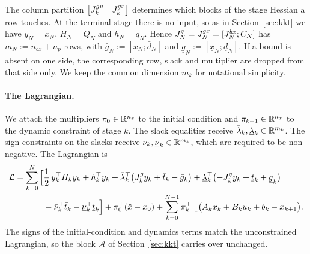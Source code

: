 The column partition $\begin{bmatrix} {J^{gu}_{k}} & {J^{gx}_{k}} \end{bmatrix}$ determines which blocks of the stage Hessian a row touches.
At the terminal stage there is no input, so as in Section~\ref{sec:kkt} we have $y_N = x_N$, $H_N = Q_N$ and $h_N = q_N$.
Hence ${J^{g}_{N}} = {J^{gx}_{N}} = [J_N^{bx}; C_N]$ has $m_N := n_{bx} + n_p$ rows, with $\bar{g}_N := [\bar{x}_N; \bar{d}_N]$ and $\underline{g}_N := [\underline{x}_N; \underline{d}_N]$.
If a bound is absent on one side, the corresponding row, slack and multiplier are dropped from that side only.
We keep the common dimension $m_k$ for notational simplicity.

\paragraph{The Lagrangian.}
We attach the multipliers $\pi_0 \in \mathbb{R}^{n_x}$ to the initial condition and $\pi_{k+1} \in \mathbb{R}^{n_x}$ to the dynamic constraint of stage $k$.
The slack equalities receive $\bar{\lambda}_k, \underline{\lambda}_k \in \mathbb{R}^{m_k}$.
The sign constraints on the slacks receive $\bar{\nu}_k, \underline{\nu}_k \in \mathbb{R}^{m_k}$, which are required to be non-negative.
The Lagrangian is
\begin{equation} \label{eq:lagrangian}
\begin{aligned}
    \mathcal{L} = \sum_{k=0}^{N} \Big[
        & \frac{1}{2}\, y_k^\top H_k y_k + h_k^\top y_k
          + \bar{\lambda}_k^\top\big({J^{g}_{k}} y_k + \bar{t}_k - \bar{g}_k\big)
          + \underline{\lambda}_k^\top\bigl(-{J^{g}_{k}} y_k + \underline{t}_k + \underline{g}_k\bigr) \\
        & - \bar{\nu}_k^\top \bar{t}_k - \underline{\nu}_k^\top \underline{t}_k \Big]
      + \pi_0^\top(\hat{x}-x_0)
      + \sum_{k=0}^{N-1} \pi_{k+1}^\top\big(A_k x_k + B_k u_k + b_k - x_{k+1}\big) .
\end{aligned}
\end{equation}
The signs of the initial-condition and dynamics terms match the unconstrained Lagrangian, so the block $\mathcal{A}$ of Section~\ref{sec:kkt} carries over unchanged.

